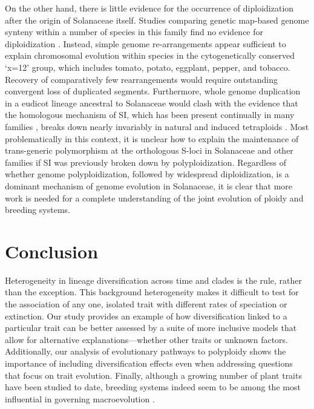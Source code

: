 On the other hand, there is little evidence for the occurrence of diploidization after the origin of Solanaceae itself.
Studies comparing genetic map-based genome synteny within a number of species in this family find no evidence for diploidization \citep{wu_2010a}.
Instead, simple genome re-arrangements appear sufficient to explain chromosomal evolution within species in the cytogenetically conserved `x=12' group, which includes tomato, potato, eggplant, pepper, and tobacco.
Recovery of comparatively few rearrangements would require outstanding convergent loss of duplicated segments.
Furthermore, whole genome duplication in a eudicot lineage ancestral to Solanaceae would clash with the evidence that the homologous mechanism of SI, which has been present continually in many families \citep{igic_2006}, breaks down nearly invariably in natural and induced tetraploids \citep{stone_2002, mcclure_2009}.
Most problematically in this context, it is unclear how to explain the maintenance of trans-generic polymorphism at the orthologous S-loci in Solanaceae and other families if SI was previously broken down by polyploidization.
%
Regardless of whether genome polyploidization, followed by widespread diploidization, is a dominant mechanism of genome evolution in Solanaceae, it is clear that more work is needed for a complete understanding of the joint evolution of ploidy and breeding systems.

\section{Conclusion}

Heterogeneity in lineage diversification across time and clades is the rule, rather than the exception.
This background heterogeneity makes it difficult to test for the association of any one, isolated trait with different rates of speciation or extinction.
Our study provides an example of how diversification linked to a particular trait can be better assessed by a suite of more inclusive models that allow for alternative explanations---whether other traits or unknown factors.
Additionally, our analysis of evolutionary pathways to polyploidy shows the importance of including diversification effects even when addressing questions that focus on trait evolution.
Finally, although a growing number of plant traits have been studied to date, breeding systems indeed seem to be among the most influential in governing macroevolution \citep{barrett1996}.
